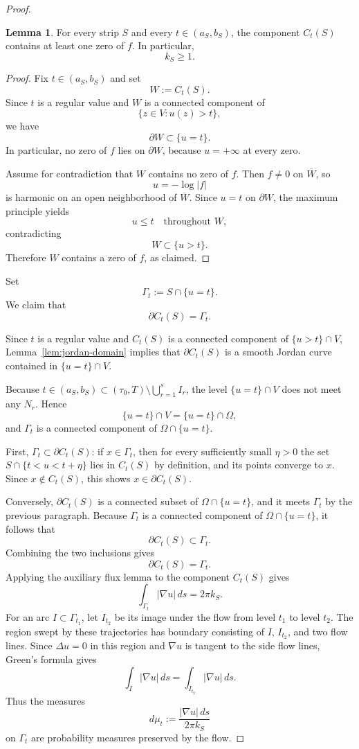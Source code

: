 \documentclass[12pt]{amsart}
\theoremstyle{definition}
\newtheorem{lemma}[theorem]{Lemma}
\theoremstyle{remark}
\begin{document}
\begin{proof}
\begin{lemma}\label{lem:strip-component-contains-zero}
For every strip $S$ and every $t \in (a_S,b_S)$, the component $C_t(S)$ contains at
least one zero of $f$. In particular,
\[
k_S \ge 1.
\]
\end{lemma}

\begin{proof}
Fix $t \in (a_S,b_S)$ and set
\[
W := C_t(S).
\]
Since $t$ is a regular value and $W$ is a connected component of
\[
\{z \in V : u(z) > t\},
\]
we have
\[
\partial W \subset \{u=t\}.
\]
In particular, no zero of $f$ lies on $\partial W$, because $u=+\infty$ at every zero.

Assume for contradiction that $W$ contains no zero of $f$. Then $f \neq 0$ on
$\overline W$, so
\[
u=-\log|f|
\]
is harmonic on an open neighborhood of $\overline W$. Since $u=t$ on $\partial W$,
the maximum principle yields
\[
u \le t \quad \text{throughout } W,
\]
contradicting
\[
W \subset \{u>t\}.
\]
Therefore $W$ contains a zero of $f$, as claimed.
\end{proof}

Set
\[
\Gamma_t:=S\cap\{u=t\}.
\]
We claim that
\[
\partial C_t(S)=\Gamma_t.
\]

Since $t$ is a regular value and $C_t(S)$ is a connected component of $\{u>t\}\cap V$,
Lemma~\ref{lem:jordan-domain} implies that $\partial C_t(S)$ is a smooth Jordan curve contained in
$\{u=t\}\cap V$.

Because $t\in (a_S,b_S)\subset (\tau_0,T)\setminus \bigcup_{r=1}^s I_r$, the level
$\{u=t\}\cap V$ does not meet any $N_r$. Hence
\[
\{u=t\}\cap V=\{u=t\}\cap \Omega,
\]
and $\Gamma_t$ is a connected component of $\Omega\cap\{u=t\}$.

First, $\Gamma_t\subset \partial C_t(S)$: if $x\in \Gamma_t$, then for every sufficiently
small $\eta>0$ the set $S\cap\{t<u<t+\eta\}$ lies in $C_t(S)$ by definition, and its
points converge to $x$. Since $x\notin C_t(S)$, this shows $x\in \partial C_t(S)$.

Conversely, $\partial C_t(S)$ is a connected subset of $\Omega\cap\{u=t\}$, and it meets
$\Gamma_t$ by the previous paragraph. Because $\Gamma_t$ is a connected component of
$\Omega\cap\{u=t\}$, it follows that
\[
\partial C_t(S)\subset \Gamma_t.
\]
Combining the two inclusions gives
\[
\partial C_t(S)=\Gamma_t.
\]
Applying the auxiliary flux lemma to the component $C_t(S)$ gives
\[
\int_{\Gamma_t} |\nabla u|\,ds = 2\pi k_S.
\]
For an arc $I\subset \Gamma_{t_1}$, let $I_{t_2}$ be its image under the flow from level $t_1$ to level $t_2$. The region swept by
these trajectories has boundary consisting of $I$, $I_{t_2}$, and two flow lines. Since $\Delta u=0$ in this region
and $\nabla u$ is tangent to the side flow lines, Green's formula gives
\[
\int_I |\nabla u|\,ds = \int_{I_{t_2}} |\nabla u|\,ds.
\]
Thus the measures
\[
 d\mu_t:=\frac{|\nabla u|\,ds}{2\pi k_S}
\]
on $\Gamma_t$ are probability measures preserved by the flow.


\end{proof}
\end{document}
